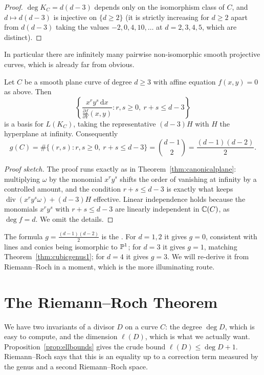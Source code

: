 \documentclass[a4paper]{scrartcl}
\newcommand{\dee}{\mathrm{d}}
\DeclareMathOperator{\Divv}{div}
\begin{document}
\begin{proof}
	$\deg K_C = d(d-3)$ depends only on the isomorphism class of $C$, and $d \mapsto d(d-3)$ is injective on $\{d \geq 2\}$ (it is strictly increasing for $d \geq 2$ apart from $d(d-3)$ taking the values $-2,0,4,10,\dots$ at $d = 2,3,4,5$, which are distinct).
\end{proof}

In particular there are infinitely many pairwise non-isomorphic smooth projective curves, which is already far from obvious.

\begin{proposition}\label{prop:canonicalbasis}
	Let $C$ be a smooth plane curve of degree $d \geq 3$ with affine equation $f(x,y) = 0$ as above. Then
	$$\left\{\frac{x^ry^s\,\dee x}{\frac{\partial f}{\partial Y}(x,y)} : r,s \geq 0,\ r+s \leq d-3\right\}$$
	is a basis for $L(K_C)$, taking the representative $(d-3)H$ with $H$ the hyperplane at infinity. Consequently
	$$g(C) = \#\{(r,s) : r,s\geq0,\ r+s\leq d-3\} = \binom{d-1}{2} = \frac{(d-1)(d-2)}{2}.$$
\end{proposition}

\begin{proof}[Proof sketch]
	The proof runs exactly as in Theorem~\ref{thm:canonicalplane}: multiplying $\omega$ by the monomial $x^ry^s$ shifts the order of vanishing at infinity by a controlled amount, and the condition $r+s\leq d-3$ is exactly what keeps $\Divv(x^ry^s\omega) + (d-3)H$ effective. Linear independence holds because the monomials $x^ry^s$ with $r+s\leq d-3$ are linearly independent in $\mathbb{C}(C)$, as $\deg f = d$. We omit the details.
\end{proof}

The formula $g = \frac{(d-1)(d-2)}{2}$ is the . For $d = 1,2$ it gives $g = 0$, consistent with lines and conics being isomorphic to $\mathbb{P}^1$; for $d = 3$ it gives $g = 1$, matching Theorem~\ref{thm:cubicgenus1}; for $d = 4$ it gives $g = 3$. We will re-derive it from Riemann--Roch in a moment, which is the more illuminating route.

\section{The Riemann--Roch Theorem}

We have two invariants of a divisor $D$ on a curve $C$: the degree $\deg D$, which is easy to compute, and the dimension $\ell(D)$, which is what we actually want. Proposition~\ref{prop:ellbounds} gives the crude bound $\ell(D)\leq\deg D + 1$. Riemann--Roch says that this is an equality up to a correction term measured by the genus and a second Riemann--Roch space.
\end{document}
